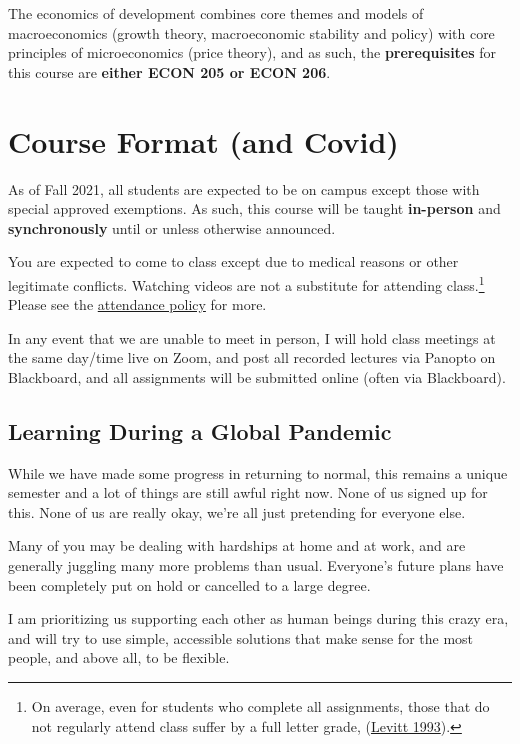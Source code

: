 \documentclass{article}
\begin{document}
The economics of development combines core themes and models of
macroeconomics (growth theory, macroeconomic stability and policy) with
core principles of microeconomics (price theory), and as such, the
\textbf{prerequisites} for this course are \textbf{either ECON 205 or
ECON 206}.

\hypertarget{course-format-and-covid}{%
\section{Course Format (and Covid)}\label{course-format-and-covid}}

As of Fall 2021, all students are expected to be on campus except those
with special approved exemptions. As such, this course will be taught
\textbf{in-person} and \textbf{synchronously} until or unless otherwise
announced.

You are expected to come to class except due to medical reasons or other
legitimate conflicts. Watching videos are not a substitute for attending
class.\footnote{On average, even for students who complete all
  assignments, those that do not regularly attend class suffer by a full
  letter grade,
  (\href{https://www.aeaweb.org/articles?id=10.1257/jep.7.3.167}{Levitt
  1993}).} Please see the \protect\hyperlink{attendance}{attendance
policy} for more.

In any event that we are unable to meet in person, I will hold class
meetings at the same day/time live on Zoom, and post all recorded
lectures via Panopto on Blackboard, and all assignments will be
submitted online (often via Blackboard).

\hypertarget{learning-during-a-global-pandemic}{%
\subsection{Learning During a Global
Pandemic}\label{learning-during-a-global-pandemic}}

While we have made some progress in returning to normal, this remains a
unique semester and a lot of things are still awful right now. None of
us signed up for this. None of us are really okay, we're all just
pretending for everyone else.

Many of you may be dealing with hardships at home and at work, and are
generally juggling many more problems than usual. Everyone's future
plans have been completely put on hold or cancelled to a large degree.

I am prioritizing us supporting each other as human beings during this
crazy era, and will try to use simple, accessible solutions that make
sense for the most people, and above all, to be flexible.
\end{document}
